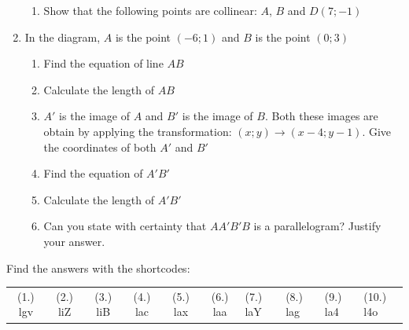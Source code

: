 \begin{enumerate}[noitemsep, label=\textbf{\arabic*}. ]
\begin{enumerate}[noitemsep, label=\textbf{\alph*}. ]
\item Show that the following points are collinear: $A$, $B$ and $D(7;-1)$
\end{enumerate}
\item In the diagram, $A$ is the point $(-6;1)$ and $B$ is the point $(0;3)$
    \setcounter{subfigure}{0}
 	\begin{figure}[H] %
    \begin{center}
    \end{center}
 \end{figure} 
      \label{m39167*id982373}\begin{enumerate}[noitemsep, label=\textbf{\alph*}. ] 
            \item Find the equation of line $AB$ 
\item Calculate the length of $AB$
\item  $A'$ is the image of $A$ and $B'$ is the image of $B$. Both these images are obtain by applying the transformation: $(x;y)\to(x - 4;y - 1)$. Give the coordinates of both $A'$ and $B'$
\item Find the equation of $A'B'$
\item Calculate the length of $A'B'$
\item Can you state with certainty that $AA'B'B$ is a parallelogram? Justify your answer.\end{enumerate}
                 \end{enumerate}
\label{m39167**end}
  \label{71522cd1c95e0cbedb9f300409036b1b**end}
\par {} Find the answers with the shortcodes:
 \par \begin{tabular}[h]{cccccc}
 (1.) lgv  &  (2.) liZ  &  (3.) liB  &  (4.) lac  &  (5.) lax  &  (6.) laa  &  (7.) laY  &  (8.) lag  &  (9.) la4  &  (10.) l4o  & \end{tabular}
